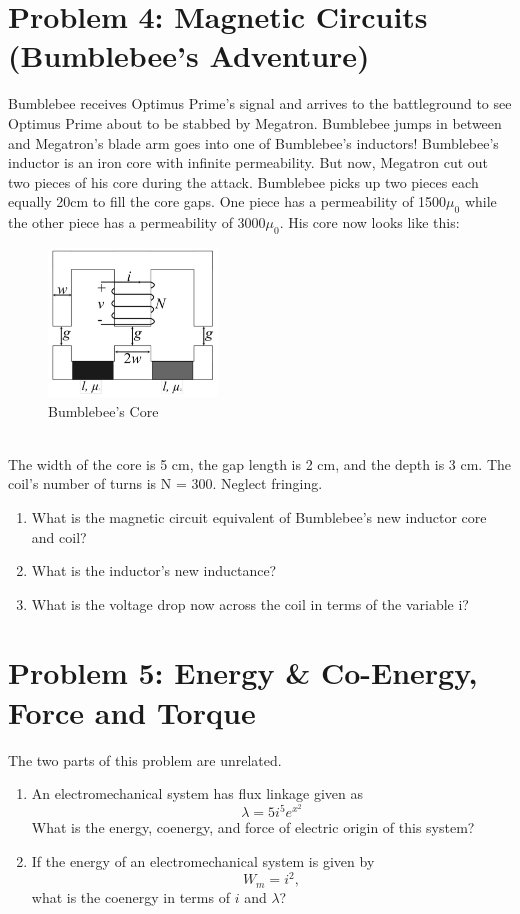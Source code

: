 \documentclass{article}
\begin{document}
\section*{Problem 4: Magnetic Circuits (Bumblebee's Adventure)}
Bumblebee receives Optimus Prime's signal and arrives to the battleground to see Optimus Prime about to be stabbed by Megatron. Bumblebee jumps in between and Megatron's blade arm goes into one of Bumblebee's inductors! Bumblebee's inductor is an iron core with infinite permeability. But now, Megatron cut out two pieces of his core during the attack. Bumblebee picks up two pieces each equally 20cm to fill the core gaps. One piece has a permeability of 1500$\mu_0$ while the other piece has a permeability of 3000$\mu_0$. His core now looks like this:
\begin{figure}[!htb]
        \centering
        \includegraphics[width=0.4\textwidth]{figures/coreQ4.PNG}
        \caption{Bumblebee's Core}
        \label{poletradsaj}
\end{figure} \\ The width of the core is 5 cm, the gap length is 2 cm, and the depth is 3 cm. The coil's number of turns is N = 300. Neglect fringing.
\begin{enumerate}[label=(\alph*)]
    \item {What is the magnetic circuit equivalent of Bumblebee's new inductor core and coil?}
    \item {What is the inductor's new inductance?}
    \item {What is the voltage drop now across the coil in terms of the variable i?}
\end{enumerate}
\newpage %
\noindent 
\section*{Problem 5: Energy \& Co-Energy, Force and Torque} 
The two parts of this problem are unrelated.
\begin{enumerate}[label=(\alph*)]
    \item {An electromechanical system has flux linkage given as
    $$\lambda = 5i^5e^{x^2}$$
    What is the energy, coenergy, and force of electric origin of this system?}
    \item {If the energy of an electromechanical system is given by $$W_m=i^2,$$ what is the coenergy in terms of $i$ and $\lambda$?}
\end{enumerate}
\end{document}

